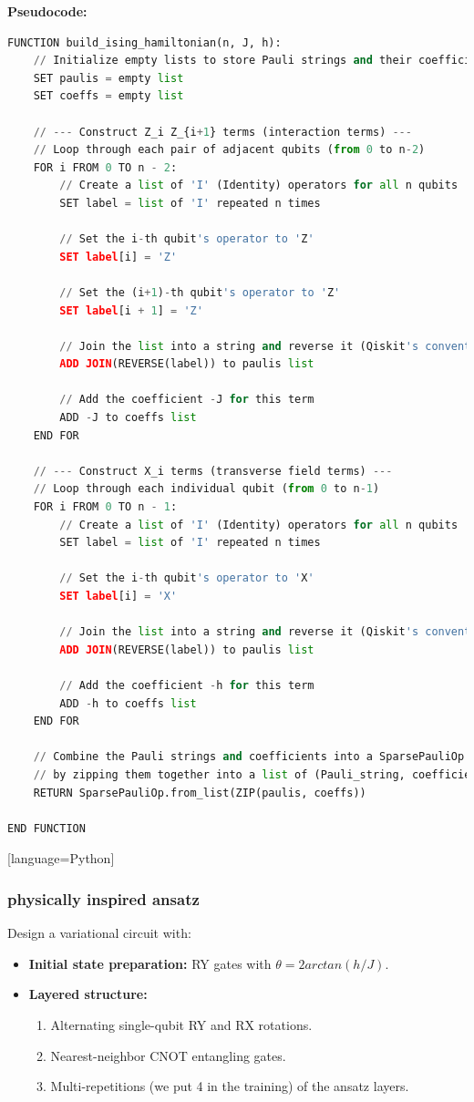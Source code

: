 \documentclass[pre,twocolumn,floatfix]{revtex4-1}
\begin{document}
\textbf{Pseudocode:}
\begin{lstlisting}[language=Python]
   FUNCTION build_ising_hamiltonian(n, J, h):
    // Initialize empty lists to store Pauli strings and their coefficients
    SET paulis = empty list
    SET coeffs = empty list

    // --- Construct Z_i Z_{i+1} terms (interaction terms) ---
    // Loop through each pair of adjacent qubits (from 0 to n-2)
    FOR i FROM 0 TO n - 2:
        // Create a list of 'I' (Identity) operators for all n qubits
        SET label = list of 'I' repeated n times

        // Set the i-th qubit's operator to 'Z'
        SET label[i] = 'Z'

        // Set the (i+1)-th qubit's operator to 'Z'
        SET label[i + 1] = 'Z'

        // Join the list into a string and reverse it (Qiskit's convention)
        ADD JOIN(REVERSE(label)) to paulis list

        // Add the coefficient -J for this term
        ADD -J to coeffs list
    END FOR

    // --- Construct X_i terms (transverse field terms) ---
    // Loop through each individual qubit (from 0 to n-1)
    FOR i FROM 0 TO n - 1:
        // Create a list of 'I' (Identity) operators for all n qubits
        SET label = list of 'I' repeated n times

        // Set the i-th qubit's operator to 'X'
        SET label[i] = 'X'

        // Join the list into a string and reverse it (Qiskit's convention)
        ADD JOIN(REVERSE(label)) to paulis list

        // Add the coefficient -h for this term
        ADD -h to coeffs list
    END FOR

    // Combine the Pauli strings and coefficients into a SparsePauliOp object
    // by zipping them together into a list of (Pauli_string, coefficient) tuples
    RETURN SparsePauliOp.from_list(ZIP(paulis, coeffs))

END FUNCTION

\end{lstlisting}[language=Python]
\subsubsection{physically inspired ansatz}
Design a variational circuit with:
\begin{itemize}
    \item \textbf{Initial state preparation:} RY gates with $\theta = 2arctan(h/J)$.
    \item \textbf{Layered structure:}
    \begin{enumerate}
        \item Alternating single-qubit RY and RX rotations.
        \item Nearest-neighbor CNOT entangling gates.
        \item Multi-repetitions (we put 4 in the training) of the ansatz layers.
    \end{enumerate}
\end{itemize}
\end{document}
